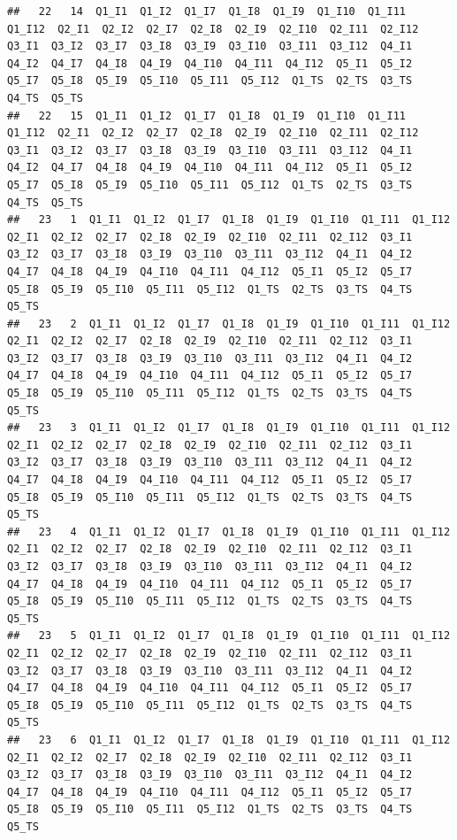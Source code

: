 \documentclass[
]{book}
\begin{document}
\begin{verbatim}
##   22   14  Q1_I1  Q1_I2  Q1_I7  Q1_I8  Q1_I9  Q1_I10  Q1_I11  Q1_I12  Q2_I1  Q2_I2  Q2_I7  Q2_I8  Q2_I9  Q2_I10  Q2_I11  Q2_I12  Q3_I1  Q3_I2  Q3_I7  Q3_I8  Q3_I9  Q3_I10  Q3_I11  Q3_I12  Q4_I1  Q4_I2  Q4_I7  Q4_I8  Q4_I9  Q4_I10  Q4_I11  Q4_I12  Q5_I1  Q5_I2  Q5_I7  Q5_I8  Q5_I9  Q5_I10  Q5_I11  Q5_I12  Q1_TS  Q2_TS  Q3_TS  Q4_TS  Q5_TS
##   22   15  Q1_I1  Q1_I2  Q1_I7  Q1_I8  Q1_I9  Q1_I10  Q1_I11  Q1_I12  Q2_I1  Q2_I2  Q2_I7  Q2_I8  Q2_I9  Q2_I10  Q2_I11  Q2_I12  Q3_I1  Q3_I2  Q3_I7  Q3_I8  Q3_I9  Q3_I10  Q3_I11  Q3_I12  Q4_I1  Q4_I2  Q4_I7  Q4_I8  Q4_I9  Q4_I10  Q4_I11  Q4_I12  Q5_I1  Q5_I2  Q5_I7  Q5_I8  Q5_I9  Q5_I10  Q5_I11  Q5_I12  Q1_TS  Q2_TS  Q3_TS  Q4_TS  Q5_TS
##   23   1  Q1_I1  Q1_I2  Q1_I7  Q1_I8  Q1_I9  Q1_I10  Q1_I11  Q1_I12  Q2_I1  Q2_I2  Q2_I7  Q2_I8  Q2_I9  Q2_I10  Q2_I11  Q2_I12  Q3_I1  Q3_I2  Q3_I7  Q3_I8  Q3_I9  Q3_I10  Q3_I11  Q3_I12  Q4_I1  Q4_I2  Q4_I7  Q4_I8  Q4_I9  Q4_I10  Q4_I11  Q4_I12  Q5_I1  Q5_I2  Q5_I7  Q5_I8  Q5_I9  Q5_I10  Q5_I11  Q5_I12  Q1_TS  Q2_TS  Q3_TS  Q4_TS  Q5_TS
##   23   2  Q1_I1  Q1_I2  Q1_I7  Q1_I8  Q1_I9  Q1_I10  Q1_I11  Q1_I12  Q2_I1  Q2_I2  Q2_I7  Q2_I8  Q2_I9  Q2_I10  Q2_I11  Q2_I12  Q3_I1  Q3_I2  Q3_I7  Q3_I8  Q3_I9  Q3_I10  Q3_I11  Q3_I12  Q4_I1  Q4_I2  Q4_I7  Q4_I8  Q4_I9  Q4_I10  Q4_I11  Q4_I12  Q5_I1  Q5_I2  Q5_I7  Q5_I8  Q5_I9  Q5_I10  Q5_I11  Q5_I12  Q1_TS  Q2_TS  Q3_TS  Q4_TS  Q5_TS
##   23   3  Q1_I1  Q1_I2  Q1_I7  Q1_I8  Q1_I9  Q1_I10  Q1_I11  Q1_I12  Q2_I1  Q2_I2  Q2_I7  Q2_I8  Q2_I9  Q2_I10  Q2_I11  Q2_I12  Q3_I1  Q3_I2  Q3_I7  Q3_I8  Q3_I9  Q3_I10  Q3_I11  Q3_I12  Q4_I1  Q4_I2  Q4_I7  Q4_I8  Q4_I9  Q4_I10  Q4_I11  Q4_I12  Q5_I1  Q5_I2  Q5_I7  Q5_I8  Q5_I9  Q5_I10  Q5_I11  Q5_I12  Q1_TS  Q2_TS  Q3_TS  Q4_TS  Q5_TS
##   23   4  Q1_I1  Q1_I2  Q1_I7  Q1_I8  Q1_I9  Q1_I10  Q1_I11  Q1_I12  Q2_I1  Q2_I2  Q2_I7  Q2_I8  Q2_I9  Q2_I10  Q2_I11  Q2_I12  Q3_I1  Q3_I2  Q3_I7  Q3_I8  Q3_I9  Q3_I10  Q3_I11  Q3_I12  Q4_I1  Q4_I2  Q4_I7  Q4_I8  Q4_I9  Q4_I10  Q4_I11  Q4_I12  Q5_I1  Q5_I2  Q5_I7  Q5_I8  Q5_I9  Q5_I10  Q5_I11  Q5_I12  Q1_TS  Q2_TS  Q3_TS  Q4_TS  Q5_TS
##   23   5  Q1_I1  Q1_I2  Q1_I7  Q1_I8  Q1_I9  Q1_I10  Q1_I11  Q1_I12  Q2_I1  Q2_I2  Q2_I7  Q2_I8  Q2_I9  Q2_I10  Q2_I11  Q2_I12  Q3_I1  Q3_I2  Q3_I7  Q3_I8  Q3_I9  Q3_I10  Q3_I11  Q3_I12  Q4_I1  Q4_I2  Q4_I7  Q4_I8  Q4_I9  Q4_I10  Q4_I11  Q4_I12  Q5_I1  Q5_I2  Q5_I7  Q5_I8  Q5_I9  Q5_I10  Q5_I11  Q5_I12  Q1_TS  Q2_TS  Q3_TS  Q4_TS  Q5_TS
##   23   6  Q1_I1  Q1_I2  Q1_I7  Q1_I8  Q1_I9  Q1_I10  Q1_I11  Q1_I12  Q2_I1  Q2_I2  Q2_I7  Q2_I8  Q2_I9  Q2_I10  Q2_I11  Q2_I12  Q3_I1  Q3_I2  Q3_I7  Q3_I8  Q3_I9  Q3_I10  Q3_I11  Q3_I12  Q4_I1  Q4_I2  Q4_I7  Q4_I8  Q4_I9  Q4_I10  Q4_I11  Q4_I12  Q5_I1  Q5_I2  Q5_I7  Q5_I8  Q5_I9  Q5_I10  Q5_I11  Q5_I12  Q1_TS  Q2_TS  Q3_TS  Q4_TS  Q5_TS

\end{verbatim}
\end{document}
